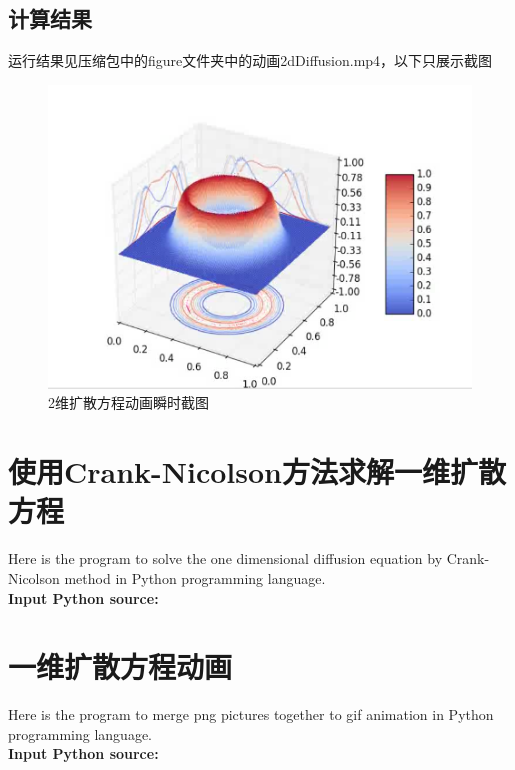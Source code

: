 \documentclass[twoside,twocolumn]{article}
\begin{document}
\begin{CJK*}{UTF8}{gkai}
\subsection{计算结果}
运行结果见压缩包中的figure文件夹中的动画2dDiffusion.mp4，以下只展示截图
\begin{figure}[h]
\centering
\includegraphics[width=1.0\linewidth]{figure/fig5}
\caption{2维扩散方程动画瞬时截图}
\label{fig:fig5}
\end{figure}


\newpage
\onecolumn
\begin{appendices}
\section{使用Crank-Nicolson方法求解一维扩散方程}
Here is the program to solve the one dimensional diffusion equation by Crank-Nicolson method in Python programming language.\\
\textbf{\textcolor[rgb]{0.98,0.00,0.00}{Input Python source:}}

\section{一维扩散方程动画}
Here is the program to merge png pictures together to gif animation in Python programming language.\\
\textbf{\textcolor[rgb]{0.98,0.00,0.00}{Input Python source:}}


\end{appendices}
\end{CJK*}
\end{document}
